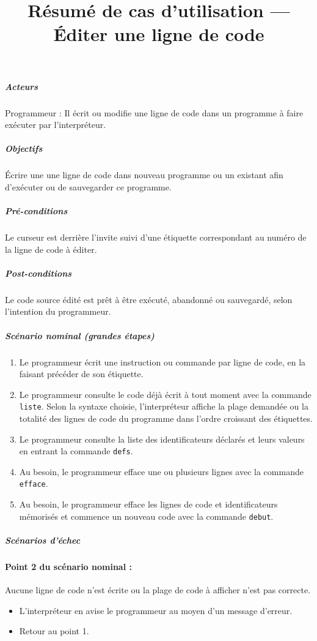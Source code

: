 
\title{Résumé de cas d'utilisation --- Éditer une ligne de code} %


        \subparagraph{Acteurs}
            Programmeur : Il écrit ou modifie une ligne de code dans un
            programme à faire exécuter par l'interpréteur.

        \subparagraph{Objectifs}
            Écrire une une ligne de code dans nouveau programme ou un
            existant afin d'exécuter ou de sauvegarder ce programme.

        \subparagraph{Pré-conditions}
                Le curseur est derrière l'invite suivi d'une étiquette correspondant
                au numéro de la ligne de code à éditer.

        \subparagraph{Post-conditions}
                Le code source édité est prêt à être exécuté, abandonné ou sauvegardé,
                selon l'intention du programmeur.

        \subparagraph{Scénario nominal (grandes étapes)}
            \begin{enumerate}
                \item Le programmeur écrit une instruction ou commande par ligne de code, en la faisant précéder de son étiquette.

                \item Le programmeur consulte le code déjà écrit à tout moment avec la
                      commande \verb|liste|. Selon la syntaxe choisie, l'interpréteur
                      affiche la plage demandée ou la totalité des lignes de code
                      du programme dans l'ordre croissant des étiquettes.

                \item Le programmeur consulte la liste des identificateurs déclarés et
                      leurs valeurs en entrant la commande \verb|defs|.

                \item Au besoin, le programmeur efface une ou plusieurs lignes avec la
                      commande \verb|efface|.

                \item Au besoin, le programmeur efface les lignes de code et identificateurs mémorisés et commence un nouveau code avec la commande \verb|debut|.
            \end{enumerate}

        \subparagraph{Scénarios d'échec}

            \paragraph{Point 2 du scénario nominal :} Aucune ligne de code n'est écrite ou
            la plage de code à afficher n'est pas correcte.
            \begin{itemize}
                \item L'interpréteur en avise le programmeur au moyen d'un message d'erreur.
                \item Retour au point 1.
            \end{itemize}

